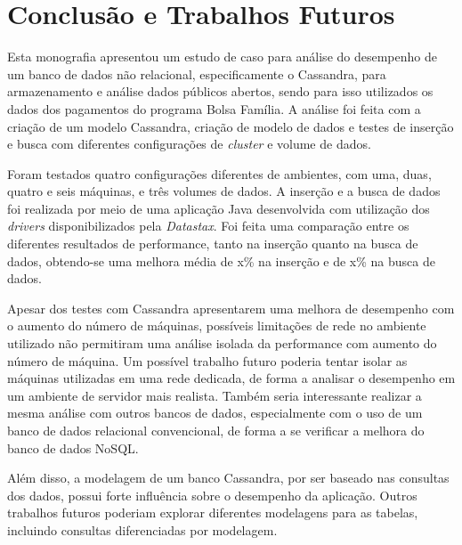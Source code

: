 \chapter{Conclusão e Trabalhos Futuros}

Esta monografia apresentou um estudo de caso para análise do desempenho de um banco de dados não relacional, especificamente o Cassandra, para armazenamento e análise dados públicos abertos, sendo para isso utilizados os dados dos pagamentos do programa Bolsa Família. A análise foi feita com a criação de um modelo Cassandra, criação de modelo de dados e testes de inserção e busca com diferentes configurações de \emph{cluster} e volume de dados.

Foram testados quatro configurações diferentes de ambientes, com uma, duas, quatro e seis máquinas, e três volumes de dados. A inserção e a busca de dados foi realizada por meio de uma aplicação Java desenvolvida com utilização dos \emph{drivers} disponibilizados pela \emph{Datastax}. Foi feita uma comparação entre os diferentes resultados de performance, tanto na inserção quanto na busca de dados, obtendo-se uma melhora média de x\% na inserção e de x\% na busca de dados.

Apesar dos testes com Cassandra apresentarem uma melhora de desempenho com o aumento do número de máquinas, possíveis limitações de rede no ambiente utilizado não permitiram uma análise isolada da performance com aumento do número de máquina. Um possível trabalho futuro poderia tentar isolar as máquinas utilizadas em uma rede dedicada, de forma a analisar o desempenho em um ambiente de servidor mais realista. Também seria interessante realizar a mesma análise com outros bancos de dados, especialmente com o uso de um banco de dados relacional convencional, de forma a se verificar a melhora do banco de dados NoSQL.

Além disso, a modelagem de um banco Cassandra, por ser baseado nas consultas dos dados, possui forte influência sobre o desempenho da aplicação. Outros trabalhos futuros poderiam explorar diferentes modelagens para as tabelas, incluindo consultas diferenciadas por modelagem.